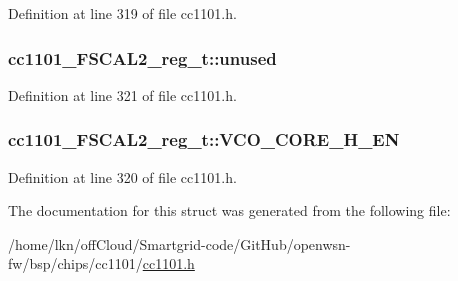 Definition at line 319 of file cc1101.\+h.

\subsubsection[{\texorpdfstring{unused}{unused}}]{ cc1101\+\_\+\+F\+S\+C\+A\+L2\+\_\+reg\+\_\+t\+::unused}\hypertarget{structcc1101___f_s_c_a_l2__reg__t_ad222ed9895da8d51de04035b6e1ef765}{}\label{structcc1101___f_s_c_a_l2__reg__t_ad222ed9895da8d51de04035b6e1ef765}


Definition at line 321 of file cc1101.\+h.

\subsubsection[{\texorpdfstring{V\+C\+O\+\_\+\+C\+O\+R\+E\+\_\+\+H\+\_\+\+EN}{VCO_CORE_H_EN}}]{ cc1101\+\_\+\+F\+S\+C\+A\+L2\+\_\+reg\+\_\+t\+::\+V\+C\+O\+\_\+\+C\+O\+R\+E\+\_\+\+H\+\_\+\+EN}\hypertarget{structcc1101___f_s_c_a_l2__reg__t_ae076a4c5c58c38fd2204f68712506cca}{}\label{structcc1101___f_s_c_a_l2__reg__t_ae076a4c5c58c38fd2204f68712506cca}


Definition at line 320 of file cc1101.\+h.



The documentation for this struct was generated from the following file\+:\begin{DoxyCompactItemize}
\item 
/home/lkn/off\+Cloud/\+Smartgrid-\/code/\+Git\+Hub/openwsn-\/fw/bsp/chips/cc1101/\hyperlink{cc1101_8h}{cc1101.\+h}\end{DoxyCompactItemize}
